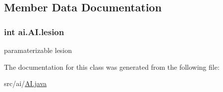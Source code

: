 \subsection{Member Data Documentation}
\hypertarget{classai_1_1_a_i_acc53cf59d664bfb248c0ebf1f7eec938}{
\subsubsection[{lesion}]{\setlength{\rightskip}{0pt plus 5cm}int {\bf ai.AI.lesion}}}
\label{classai_1_1_a_i_acc53cf59d664bfb248c0ebf1f7eec938}
paramaterizable lesion 

The documentation for this class was generated from the following file:\begin{DoxyCompactItemize}
\item 
src/ai/\hyperlink{_a_i_8java}{AI.java}\end{DoxyCompactItemize}
